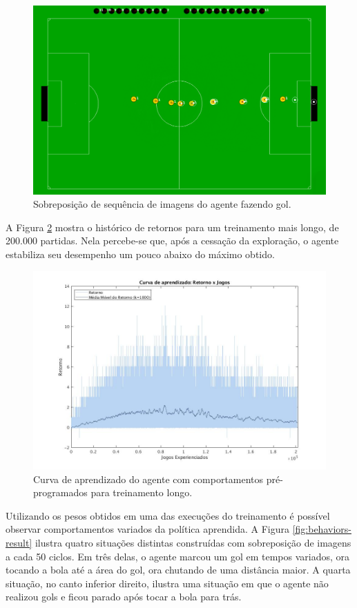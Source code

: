 \begin{figure}[H]
	\includegraphics[width=0.9\linewidth]{figs/goal-sequence.png}
	\centering
	\caption{Sobreposição de sequência de imagens do agente fazendo gol.}
	\label{fig:goal-seq}
\end{figure}

A Figura \ref{fig:curvalonga-bhv} mostra o histórico de retornos para um treinamento mais longo, de 200.000 partidas. Nela percebe-se que, após a cessação da exploração, o agente estabiliza seu desempenho um pouco abaixo do máximo obtido.

\begin{figure}[H]
	\includegraphics[width=0.9\linewidth]{figs/curvalonga-behaviors-tabular.jpg}
	\centering
	\caption{Curva de aprendizado do agente com comportamentos pré-programados para treinamento longo.}
	\label{fig:curvalonga-bhv}
\end{figure}

Utilizando os pesos obtidos em uma das execuções do treinamento é possível observar comportamentos variados da política aprendida. A Figura \ref{fig:behaviors-result} ilustra quatro situações distintas construídas com sobreposição de imagens a cada 50 ciclos. Em três delas, o agente marcou um gol em tempos variados, ora tocando a bola até a área do gol, ora chutando de uma distância maior. A quarta situação, no canto inferior direito, ilustra uma situação em que o agente não realizou gols e ficou parado após tocar a bola para trás.

